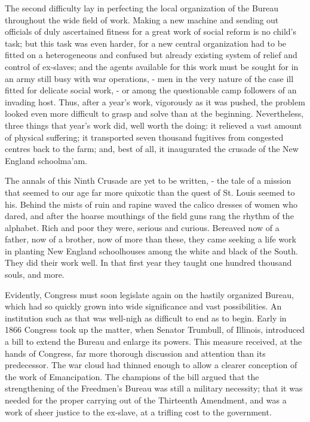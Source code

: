 The second difficulty lay in perfecting the local organization of the Bureau throughout the wide field of work. Making a new machine and sending out officials of duly ascertained fitness for a great work of social reform is no child’s task; but this task was even harder, for a new central organization had to be fitted on a heterogeneous and confused but already existing system of relief and control of ex-slaves; and the agents available for this work must be sought for in an army still busy with war operations, - men in the very nature of the case ill fitted for delicate social work, - or among the questionable camp followers of an invading host. Thus, after a year’s work, vigorously as it was pushed, the problem looked even more difficult to grasp and solve than at the beginning. Nevertheless, three things that year’s work did, well worth the doing: it relieved a vast amount of physical suffering; it transported seven thousand fugitives from congested centres back to the farm; and, best of all, it inaugurated the crusade of the New England schoolma’am.\par

The annals of this Ninth Crusade are yet to be written, - the tale of a mission that seemed to our age far more quixotic than the quest of St. Louis seemed to his. Behind the mists of ruin and rapine waved the calico dresses of women who dared, and after the hoarse mouthings of the field guns rang the rhythm of the alphabet. Rich and poor they were, serious and curious. Bereaved now of a father, now of a brother, now of more than these, they came seeking a life work in planting New England schoolhouses among the white and black of the South. They did their work well. In that first year they taught one hundred thousand souls, and more.\par

Evidently, Congress must soon legislate again on the hastily organized Bureau, which had so quickly grown into wide significance and vast possibilities. An institution such as that was well-nigh as difficult to end as to begin. Early in 1866 Congress took up the matter, when Senator Trumbull, of Illinois, introduced a bill to extend the Bureau and enlarge its powers. This measure received, at the hands of Congress, far more thorough discussion and attention than its predecessor. The war cloud had thinned enough to allow a clearer conception of the work of Emancipation. The champions of the bill argued that the strengthening of the Freedmen’s Bureau was still a military necessity; that it was needed for the proper carrying out of the Thirteenth Amendment, and was a work of sheer justice to the ex-slave, at a trifling cost to the government.\par

